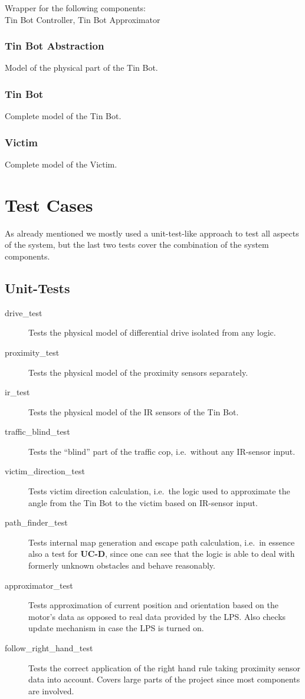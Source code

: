 \documentclass[a4paper,parskip,headheight=38pt]{scrartcl} %
\begin{document}
Wrapper for the following components: \\
Tin Bot Controller, Tin Bot Approximator

\subsubsection{Tin Bot Abstraction}
Model of the physical part of the Tin Bot.

\subsubsection{Tin Bot}
Complete model of the Tin Bot.

\subsubsection{Victim}
Complete model of the Victim.

\section{Test Cases}
As already mentioned we mostly used a unit-test-like approach to test all aspects of the system, but the last two tests cover the combination of the system components.

\subsection{Unit-Tests}
\begin{description}
\item[drive\_test] Tests the physical model of differential drive isolated from any logic.
\item[proximity\_test] Tests the physical model of the proximity sensors separately. %
\item[ir\_test] Tests the physical model of the IR sensors of the Tin Bot.
\item[traffic\_blind\_test] Tests the \enquote{blind} part of the traffic cop, i.e.\ without any IR-sensor input.
\item[victim\_direction\_test] Tests victim direction calculation, i.e.\ the logic used to approximate the angle from the Tin Bot to the victim based on IR-sensor input.
\item[path\_finder\_test] Tests internal map generation and escape path calculation, i.e.\ in essence also a test for \textbf{UC-D}, since one can see that the logic is able to deal with formerly unknown obstacles and behave reasonably.
\item[approximator\_test] Tests approximation of current position and orientation based on the motor's data as opposed to real data provided by the LPS. Also checks update mechanism in case the LPS is turned on.
\item[follow\_right\_hand\_test] Tests the correct application of the right hand rule taking proximity sensor data into account. Covers large parts of the project since most components are involved.
\end{description}
\end{document}
